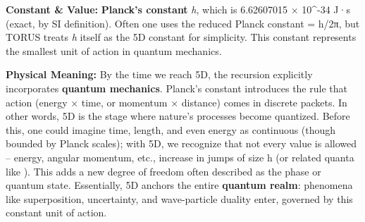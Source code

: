 \documentclass[
]{article}
\begin{document}
\textbf{Constant \& Value:} \textbf{Planck's constant} \emph{h}, which
is 6.62607015 × 10\^{}-34 J·s (exact, by SI definition)\hspace{0pt}.
Often one uses the reduced Planck constant \hbar = h/2π, but TORUS treats
\emph{h} itself as the 5D constant for simplicity. This constant
represents the smallest unit of action in quantum mechanics.

\textbf{Physical Meaning:} By the time we reach 5D, the recursion
explicitly incorporates \textbf{quantum mechanics}. Planck's constant
introduces the rule that action (energy × time, or momentum × distance)
comes in discrete packets. In other words, 5D is the stage where
nature's processes become quantized\hspace{0pt}. Before this, one could
imagine time, length, and even energy as continuous (though bounded by
Planck scales); with 5D, we recognize that not every value is allowed --
energy, angular momentum, etc., increase in jumps of size h (or related
quanta like \hbar). This adds a new degree of freedom often described as the
phase or quantum state. Essentially, 5D anchors the entire
\textbf{quantum realm}: phenomena like superposition, uncertainty, and
wave-particle duality enter, governed by this constant unit of action.
\end{document}
